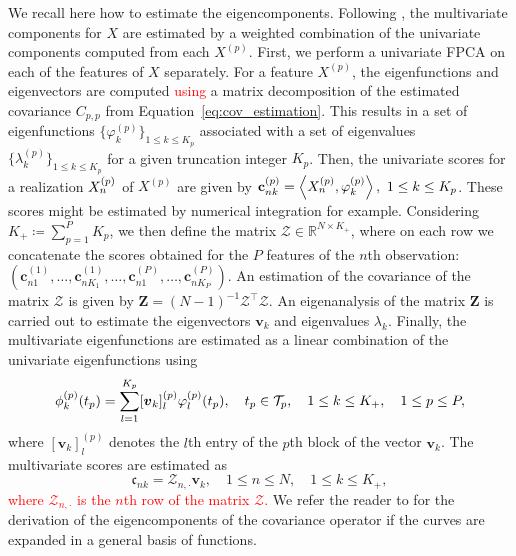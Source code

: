 We recall here how to estimate the eigencomponents. Following \citet[Prop.~5]{happMultivariateFunctionalPrincipal2018a}, the multivariate components for $X$ are estimated by a weighted combination of the univariate components computed from each $X^{(p)}$. First, we perform a univariate FPCA on each of the features of $X$ separately. For a feature $X^{(p)}$, the eigenfunctions and eigenvectors are computed \textcolor{red}{using} a matrix decomposition of the estimated covariance $C_{p, p}$ from Equation~\eqref{eq:cov_estimation}. This results in a set of eigenfunctions $\{\varphi_k^{(p)}\}_{1 \leq k \leq K_p}$ associated with a set of eigenvalues $\{\lambda_k^{(p)}\}_{1 \leq k \leq K_p}$ for a given truncation integer $K_p$. Then, the univariate scores for a realization $X_n^{(p)}$ of $X^{(p)}$ are given by $\mathbf{c}_{nk}^{(p)} = \left\langle X_n^{(p)}, \varphi_k^{(p)}\right\rangle, ~1 \leq k \leq K_p$. These scores might be estimated by numerical integration for example. Considering $K_+ \coloneqq \sum_{p = 1}^P K_p$, we then define the matrix $\mathcal{Z} \in \mathbb{R}^{N \times K_+}$, where on each row we concatenate the scores obtained for the $P$ features of the $n$th observation: 
$(\mathbf{c}_{n1}^{(1)}, \ldots, \mathbf{c}_{nK_1}^{(1)}, \ldots, \mathbf{c}_{n1}^{(P)}, \ldots, \mathbf{c}_{nK_P}^{(P)})$. An estimation of the covariance of the matrix $\mathcal{Z}$ is given by $\mathbf{Z} = (N - 1)^{-1}\mathcal{Z}^\top\mathcal{Z}$. An eigenanalysis of the matrix $\mathbf{Z}$ is carried out to estimate the eigenvectors $\boldsymbol{v}_k$ and eigenvalues $\lambda_k$. Finally, the multivariate eigenfunctions are estimated as a linear combination of the univariate eigenfunctions using
\begin{equation*}
\phi_k^{(p)}(t_p) = \sum_{l = 1}^{K_p}[\boldsymbol{v}_k]_{l}^{(p)}\varphi_{l}^{(p)}(t_p),\quad t_p \in \mathcal{T}_{p},\quad 1 \leq k \leq K_+,\quad 1 \leq p \leq P,
\end{equation*}
where $[\boldsymbol{v}_k]^{(p)}_{l}$ denotes the $l$th entry of the $p$th block of the vector $\boldsymbol{v}_k$. The multivariate scores are estimated as
$$\mathfrak{c}_{nk} = \mathcal{Z}_{{n,\cdot}}\boldsymbol{v}_k, \quad 1 \leq n \leq N, \quad 1 \leq k \leq K_+,$$
\textcolor{red}{where $\mathcal{Z}_{{n,\cdot}}$ is the $n$th row of the matrix $\mathcal{Z}$.}
We refer the reader to \cite{happMultivariateFunctionalPrincipal2018a} for the derivation of the eigencomponents of the covariance operator if the curves are expanded in a general basis of functions.


